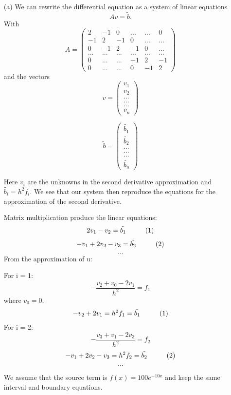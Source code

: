 \documentclass[a4paper,12pt, english]{article}
\begin{document}
\begin{enumerate}
\item[(a)]
We can rewrite the differential equation as a system of linear equations $$ Av = \tilde{b}. $$
With
\[ A = \left( \begin{array}{cccccc}
2 & -1 & 0 & ... & ... & 0\\
-1 & 2 & -1 & 0 & ... & ... \\
0 & -1 & 2 & -1 & 0 & ... \\
... & ... & ... & ... & ... &...\\
0 & ... & ... & -1 & 2 & -1 \\
0 & ... & ... & 0 & -1 & 2 \end{array} \right)\] 
and the vectors
\[ v = \left( \begin{array}{c}
v_{1}\\
v_{2}\\
...\\
...\\
...\\
v_{n} \end{array} \right)\]  

\[ \tilde{b} = \left( \begin{array}{c}
\tilde{b_{1}}\\
\tilde{b_{2}}\\
...\\
...\\
...\\
\tilde{b_{n}} \end{array} \right)\]

 Here $v_{i}$ are the unknowns in the second derivative approximation and $\tilde{b_{i}} = h^2 f_{i} $.
We see that our system then reproduce the equations for the approximation of the second derivative.

Matrix multiplication produce the linear equations:
$$2v_{1} - v_{2} = \tilde{b_{1}} \hspace{10mm} (1)$$
$$-v_{1} +2v_{2} - v_{3} = \tilde{b_{2}} \hspace{10mm} (2)$$
$$ ... $$
From the approximation of u:

For i = 1: $$ -\frac{v_{2}+v_{0}-2v_{1}}{h^2} = f_{1} $$ where $v_{0}=0$.
$$-v_{2}+2v_{1} = h^2 f_{1} = \tilde{b_{1}} \hspace{10mm} (1)$$
For i = 2: $$ -\frac{v_{3}+v_{1}-2v_{3}}{h^2} = f_{2} $$
$$-v_{1} +2v_{2} - v_{3} = h^2f_{2} = \tilde{b_{2}} \hspace{10mm} (2)$$
$$...$$

We assume that the source term is $f(x) = 100 e^{-10x}$ and keep the same interval and boundary equations.


\end{enumerate}
\end{document}
